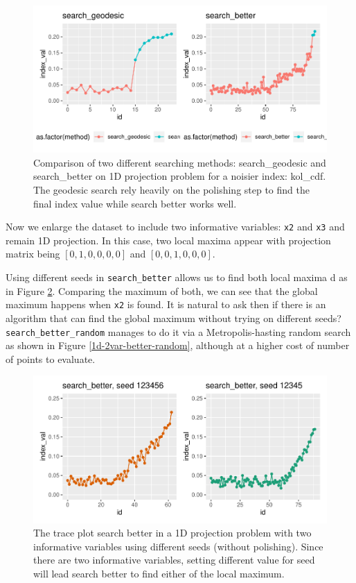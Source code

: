 \documentclass[12pt]{article}
\begin{document}
\begin{figure}
\centering
\includegraphics{paper_files/figure-latex/kol-cdf-1.pdf}
\caption{\label{kol-cdf}Comparison of two different searching methods:
search\_geodesic and search\_better on 1D projection problem for a
noisier index: kol\_cdf. The geodesic search rely heavily on the
polishing step to find the final index value while search better works
well.}
\end{figure}

Now we enlarge the dataset to include two informative variables:
\texttt{x2} and \texttt{x3} and remain 1D projection. In this case, two
local maxima appear with projection matrix being \([0, 1, 0, 0, 0, 0]\)
and \([0, 0, 1 ,0, 0, 0]\).

Using different seeds in \texttt{search\_better} allows us to find both
local maxima d as in Figure \ref{1d-2var-different-seeds}. Comparing the
maximum of both, we can see that the global maximum happens when
\texttt{x2} is found. It is natural to ask then if there is an algorithm
that can find the global maximum without trying on different seeds?
\texttt{search\_better\_random} manages to do it via a
Metropolis-hasting random search as shown in Figure
\ref{1d-2var-better-random}, although at a higher cost of number of
points to evaluate.

\begin{figure}
\centering
\includegraphics{paper_files/figure-latex/1d-2var-different-seeds-1.pdf}
\caption{\label{1d-2var-different-seeds}The trace plot search better in
a 1D projection problem with two informative variables using different
seeds (without polishing). Since there are two informative variables,
setting different value for seed will lead search better to find either
of the local maximum.}
\end{figure}
\end{document}
